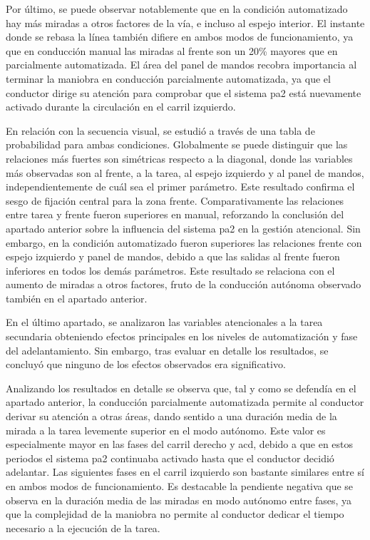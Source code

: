 Por último, se puede observar notablemente que en la condición automatizado hay más miradas a otros factores de la vía, e incluso al espejo interior. El instante donde se rebasa la línea también difiere en ambos modos de funcionamiento, ya que en conducción manual las miradas al frente son un 20\% mayores que en parcialmente automatizada. El área del panel de mandos recobra importancia al terminar la maniobra en conducción parcialmente automatizada, ya que el conductor dirige su atención para comprobar que el sistema \gls{pa2} está nuevamente activado durante la circulación en el carril izquierdo.

En relación con la secuencia visual, se estudió a través de una tabla de probabilidad para ambas condiciones. Globalmente se puede distinguir que las relaciones más fuertes son simétricas respecto a la diagonal, donde las variables más observadas son al frente, a la tarea, al espejo izquierdo y al panel de mandos, independientemente de cuál sea el primer parámetro.  Este resultado confirma el sesgo de fijación central para la zona frente. Comparativamente las relaciones entre tarea y frente fueron superiores en manual, reforzando la conclusión del apartado anterior sobre la influencia del sistema \gls{pa2} en la gestión atencional. Sin embargo, en la condición automatizado fueron superiores las relaciones frente con espejo izquierdo y panel de mandos, debido a que las salidas al frente fueron inferiores en todos los demás parámetros. Este resultado se relaciona con el aumento de miradas a otros factores, fruto de la conducción autónoma observado también en el apartado anterior.

En el último apartado, se analizaron las variables atencionales a la tarea secundaria obteniendo efectos principales en los niveles de automatización y fase del adelantamiento. Sin embargo, tras evaluar en detalle los resultados, se concluyó que ninguno de los efectos observados era significativo. 

Analizando los resultados en detalle se observa que, tal y como se defendía en el apartado anterior, la conducción parcialmente automatizada permite al conductor derivar su atención a otras áreas, dando sentido a una duración media de la mirada a la tarea levemente superior en el modo autónomo. Este valor es especialmente mayor en las fases del carril derecho y \gls{acd}, debido a que en estos periodos el sistema \gls{pa2} continuaba activado hasta que el conductor decidió adelantar. Las siguientes fases en el carril izquierdo son bastante similares entre sí en ambos modos de funcionamiento. Es destacable la pendiente negativa que se observa en la duración media de las miradas en modo autónomo entre fases, ya que la complejidad de la maniobra no permite al conductor dedicar el tiempo necesario a la ejecución de la tarea.

